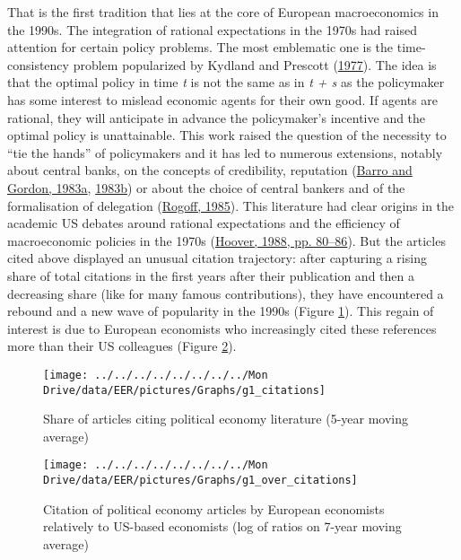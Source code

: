 \documentclass[
]{article}
\begin{document}
That is the first tradition that lies at the core of European
macroeconomics in the 1990s. The integration of rational expectations in
the 1970s had raised attention for certain policy problems. The most
emblematic one is the time-consistency problem popularized by Kydland
and Prescott (\protect\hyperlink{ref-kydland1977}{1977}). The idea is
that the optimal policy in time \emph{t} is not the same as in \emph{t +
s} as the policymaker has some interest to mislead economic agents for
their own good. If agents are rational, they will anticipate in advance
the policymaker's incentive and the optimal policy is unattainable. This
work raised the question of the necessity to ``tie the hands'' of
policymakers and it has led to numerous extensions, notably about
central banks, on the concepts of credibility, reputation
(\protect\hyperlink{ref-barro1983}{Barro and Gordon, 1983a},
\protect\hyperlink{ref-barro1983c}{1983b}) or about the choice of
central bankers and of the formalisation of delegation
(\protect\hyperlink{ref-rogoff1985b}{Rogoff, 1985}). This literature had
clear origins in the academic US debates around rational expectations
and the efficiency of macroeconomic policies in the 1970s
(\protect\hyperlink{ref-hoover1988}{Hoover, 1988, pp. 80--86}). But the
articles cited above displayed an unusual citation trajectory: after
capturing a rising share of total citations in the first years after
their publication and then a decreasing share (like for many famous
contributions), they have encountered a rebound and a new wave of
popularity in the 1990s (Figure \ref{fig:plot-political-economy}). This
regain of interest is due to European economists who increasingly cited
these references more than their US colleagues (Figure
\ref{fig:plot-political-economy-europe}).

\begin{figure}[h]

{\centering \texttt{[image: ../../../../../../../../Mon Drive/data/EER/pictures/Graphs/g1\_citations]} 

}

\caption{Share of articles citing political economy literature (5-year moving average)}\label{fig:plot-political-economy}
\end{figure}

\begin{figure}[h]

{\centering \texttt{[image: ../../../../../../../../Mon Drive/data/EER/pictures/Graphs/g1\_over\_citations]} 

}

\caption{Citation of political economy articles by European economists relatively to US-based economists (log of ratios on 7-year moving average)}\label{fig:plot-political-economy-europe}
\end{figure}
\end{document}
